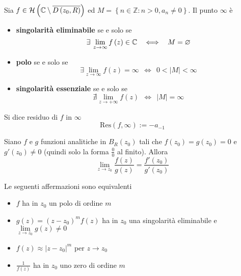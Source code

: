 \begin{thm}
Sia $f\in \mathcal{H} \left(\mathbb{C}  \setminus \overline{D\left( z_{0} ,R\right)}\right)$ ed $M=\left\{n\in \mathbb{Z} :n >0,a_{n} \neq 0\right\}$. Il punto $\infty $ è

\begin{itemize}
\item \textbf{singolarità eliminabile} se e solo se\begin{equation*}
\exists \lim\limits _{z\rightarrow \infty } f\left( z\right) \in \CC  \ \ \iff \ \ M=\emptyset 
\end{equation*}
\item \textbf{polo} se e solo se\begin{equation*}
\exists \lim\limits _{z\rightarrow \infty } f\left( z\right) =\infty \ \ \iff \ \ 0< \left| M\right| < \infty 
\end{equation*}
\item \textbf{singolarità essenziale} se e solo se\begin{equation*}
\nexists \lim\limits _{z\rightarrow +\infty } f\left( z\right) \ \ \iff \ \ \left| M\right| =\infty 
\end{equation*}
\end{itemize}
\end{thm}
\begin{defn}
Si dice residuo di $f$ in $\infty $
\begin{equation*}
\mathrm{Res}\left( f,\infty \right) :=-a_{-1}
\end{equation*}
\end{defn}
\begin{thm}
[di De l'Hôpital] Siano $f$ e $g$ funzioni analitiche in $B_{R}\left( z_{0}\right)$ tali che $f\left( z_{0}\right) =g\left( z_{0}\right) =0$ e $g'\left( z_{0}\right) \neq 0$ (quindi solo la forma $\frac{0}{0}$ al finito). Allora
\begin{equation*}
\lim\limits _{z\rightarrow z_{0}}\frac{f\left( z\right)}{g\left( z\right)} =\frac{f'\left( z_{0}\right)}{g'\left( z_{0}\right)}
\end{equation*}
\end{thm}
\begin{thm}
Le seguenti affermazioni sono equivalenti
\begin{itemize}
\item $f$ ha in $z_{0}$ un polo di ordine $m$
\item $g\left( z\right) =\left( z-z_{0}\right)^{m} f\left( z\right)$ ha in $z_{0}$ una singolarità eliminabile e $\lim\limits _{z\rightarrow z_{0}} g\left( z\right) \neq 0$
\item $f\left( z\right) \approx \left| z-z_{0}\right| ^{m}$ per $z\rightarrow z_{0}$
\item $\frac{1}{f\left( z\right)}$ ha in $z_{0}$ uno zero di ordine $m$
\end{itemize}
\end{thm}

